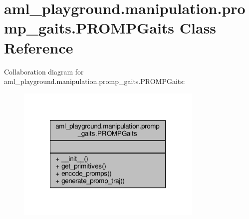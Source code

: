 \hypertarget{classaml__playground_1_1manipulation_1_1promp__gaits_1_1_p_r_o_m_p_gaits}{\section{aml\-\_\-playground.\-manipulation.\-promp\-\_\-gaits.\-P\-R\-O\-M\-P\-Gaits Class Reference}
\label{classaml__playground_1_1manipulation_1_1promp__gaits_1_1_p_r_o_m_p_gaits}
}


Collaboration diagram for aml\-\_\-playground.\-manipulation.\-promp\-\_\-gaits.\-P\-R\-O\-M\-P\-Gaits\-:
\nopagebreak
\begin{figure}[H]
\begin{center}
\leavevmode
\includegraphics[width=252pt]{classaml__playground_1_1manipulation_1_1promp__gaits_1_1_p_r_o_m_p_gaits__coll__graph}
\end{center}
\end{figure}
